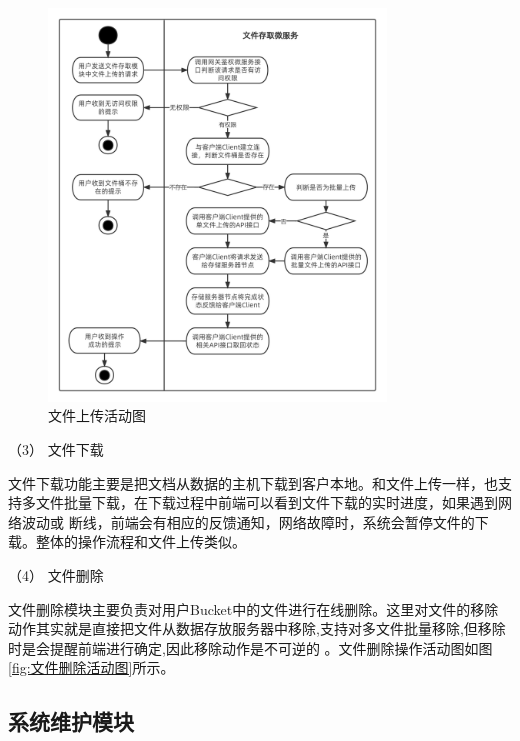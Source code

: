 \begin{figure}[htb]
    \centering
    \includegraphics[width=0.8\textwidth]{my_figures/chapter4/文件上传活动图.png}
    \caption{文件上传活动图}
    \label{fig:文件上传活动图}
\end{figure}

（3） 文件下载


文件下载功能主要是把文档从数据的主机下载到客户本地。和文件上传一样，也支持多文件批量下载，在下载过程中前端可以看到文件下载的实时进度，如果遇到网络波动或
断线，前端会有相应的反馈通知，网络故障时，系统会暂停文件的下载。整体的操作流程和文件上传类似。

（4） 文件删除

文件删除模块主要负责对用户Bucket中的文件进行在线删除。这里对文件的移除动作其实就是直接把文件从数据存放服务器中移除,支持对多文件批量移除,但移除时是会提醒前端进行确定,因此移除动作是不可逆的
。文件删除操作活动图如图\ref{fig:文件删除活动图}所示。


\subsection{系统维护模块}


